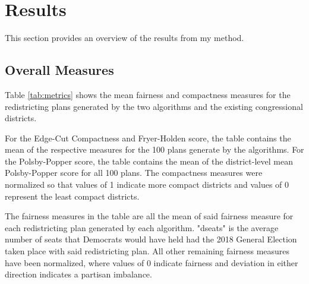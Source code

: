 \section{Results}

This section provides an overview of the results from my method. 

\subsection{Overall Measures}


Table \ref{tab:metrics} shows the mean fairness and compactness measures for the redistricting plans generated by the two algorithms and the existing congressional districts. 

For the Edge-Cut Compactness and Fryer-Holden score, the table contains the mean of the respective measures for the 100 plans generate by the algorithms. For the Polsby-Popper score, the table contains the mean of the district-level mean Polsby-Popper score for all 100 plans. The compactness measures were normalized so that values of 1 indicate more compact districts and values of 0 represent the least compact districts. 

The fairness measures in the table are all the mean of said fairness measure for each redistricting plan generated by each algorithm. "dseats" is the average number of seats that Democrats would have held had the 2018 General Election taken place with said redistricting plan. All other remaining fairness measures have been normalized, where values of 0 indicate fairness and deviation in either direction indicates a partisan imbalance. 

